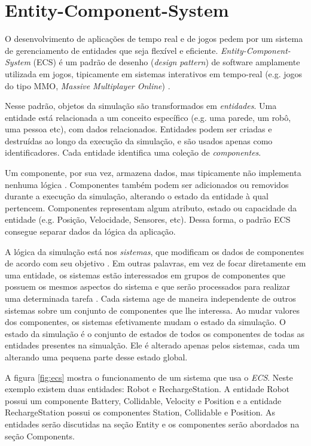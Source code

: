 \section{Entity-Component-System}
\label{sec:ECS}

O desenvolvimento de aplicações de tempo real e de jogos pedem por um sistema de gerenciamento de entidades que seja flexível e eficiente. \textit{Entity-Component-System} (ECS) é um padrão de desenho (\textit{design pattern}) de software amplamente utilizada em jogos, tipicamente em sistemas interativos em tempo-real (e.g. jogos do tipo MMO, \textit{Massive Multiplayer Online}) \cite{wiebusch2015decoupling}. 


Nesse padrão, objetos da simulação são transformados em \textit{entidades}. Uma entidade está relacionada a um conceito específico (e.g. uma parede, um robô, uma pessoa etc), com dados relacionados. Entidades podem ser criadas e destruídas ao longo da execução da simulação, e são usados apenas como identificadores. Cada entidade identifica uma coleção de \textit{componentes}. 

Um componente, por sua vez, armazena dados, mas tipicamente não implementa nenhuma lógica \cite{advantagesEcs}. Componentes também podem ser adicionados ou removidos durante a execução da simulação, alterando o estado da entidade à qual pertencem. Componentes representam algum atributo, estado ou capacidade da entidade (e.g. Posição, Velocidade, Sensores, etc). Dessa forma, o padrão ECS consegue separar dados da lógica da aplicação.

A lógica da simulação está nos \textit{sistemas}, que modificam os dados de componentes de acordo com seu objetivo \cite{multiEcs}. Em outras palavras, em vez de focar diretamente em uma entidade, os sistemas estão interessados em grupos de componentes que possuem os mesmos aspectos do sistema e que serão processados para realizar uma determinada tarefa \cite{advantagesEcs}. Cada sistema age de maneira independente de outros sistemas sobre um conjunto de componentes que lhe interessa. Ao mudar valores dos componentes, os sistemas efetivamente mudam o estado da simulação. O estado da simulação é o conjunto de estados de todos os componentes de todas as entidades presentes na simualção. Ele é alterado apenas pelos sistemas, cada um alterando uma pequena parte desse estado global. 

A figura \ref{fig:ecs} mostra o funcionamento de um sistema que usa o \textit{ECS}. Neste exemplo existem duas entidades: Robot e RechargeStation. A entidade Robot possui um componente Battery, Collidable, Velocity e Position e a entidade RechargeStation possui os componentes Station, Collidable e Position. As entidades serão discutidas na seção Entity e os componentes serão abordados na seção Components. 

